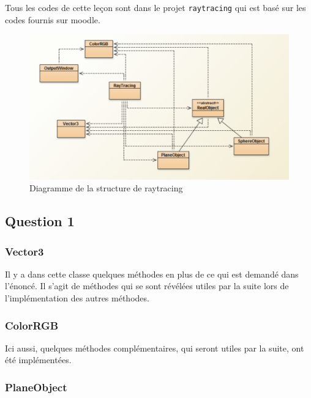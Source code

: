 Tous les codes de cette leçon sont dans le projet \texttt{raytracing} qui est basé sur les codes fournis sur moodle. 

\begin{figure}[H]
	\caption{\label{9_structure} Diagramme de la structure de raytracing}
	\centering
	\includegraphics[scale = 0.4]{Figures/9_structure.png}
\end{figure}

\subsection{Question 1}

\subsubsection{Vector3}

Il y a dans cette classe quelques méthodes en plus de ce qui est demandé dans l'énoncé. Il s'agit de méthodes qui se sont révélées utiles par la suite lors de l'implémentation des autres méthodes.


\subsubsection{ColorRGB}

Ici aussi, quelques méthodes complémentaires, qui seront utiles par la suite, ont été implémentées.


\subsubsection{PlaneObject}

